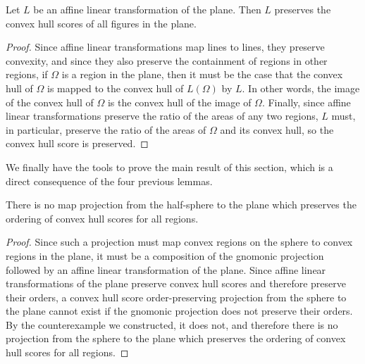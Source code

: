 \begin{lemma}\label{lem:noafflin}
  Let $L$ be an affine linear transformation of the plane.  Then $L$ preserves the convex hull scores of all figures in the plane.

\end{lemma}
\begin{proof}
  Since affine linear transformations map lines to lines, they preserve
  convexity, and since they also preserve the containment of regions in
  other regions, if $\Omega$ is a region in the plane, then it must be
  the case that the convex hull of $\Omega$ is mapped to the convex hull
  of $L(\Omega)$ by $L$.  In other words, the image of the convex hull
  of $\Omega$ is the convex hull of the image of $\Omega$.  Finally,
  since affine linear transformations preserve the ratio of the areas of
  any two regions, $L$ must, in particular, preserve the ratio of the
  areas of $\Omega$ and its convex hull, so the convex hull score is
  preserved.
\end{proof}

We finally have the tools to prove the main result of this section,
which is a direct consequence of the four previous lemmas.

\begin{theorem}
  There is no map projection from the half-sphere to the plane which
  preserves the ordering of convex hull scores for all regions.
\end{theorem}

\begin{proof}
  Since such a projection must map convex regions on the sphere to
  convex regions in the plane, it must be a composition of the gnomonic
  projection followed by an affine linear transformation of the plane.
  Since affine linear transformations of the plane preserve convex hull
  scores and therefore preserve their orders, a convex hull score
  order-preserving projection from the sphere to the plane cannot exist
  if the gnomonic projection does not preserve their orders.  By the
  counterexample we constructed, it does not, and therefore there is no
  projection from the sphere to the plane which preserves the ordering
  of convex hull scores for all regions.
\end{proof}
